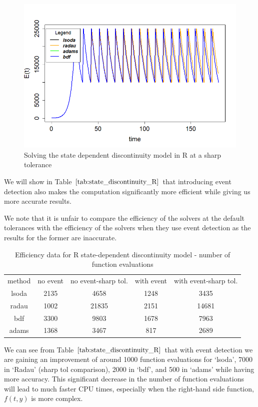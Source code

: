 \begin{figure}[H]
\centering
\includegraphics[width=0.7\linewidth]{./figures/solve_state_discontinuity_sharp_R}
\caption{Solving the state dependent discontinuity model in R at a sharp tolerance}
\label{fig:solve_state_discontinuity_sharp_R}
\end{figure}

We will show in Table $\ref{tab:state_discontinuity_R}$ that introducing event detection also makes the computation significantly more efficient while giving us more accurate results.

We note that it is unfair to compare the efficiency of the solvers at the default tolerances with the efficiency of the solvers when they use event detection as the results for the former are inaccurate.

\begin{table}[h]
\caption {Efficiency data for R state-dependent discontinuity model - number of function evaluations} 
\label{tab:state_discontinuity_R}
\begin{center}
\begin{tabular}{ c c c c c } 
method & no event & no event-sharp tol. & with event & with event-sharp tol.\\ 
lsoda & 2135 & 4658 & 1248 & 3435 \\
radau & 1002 & 21835 & 2151 & 14681\\
bdf & 3300 & 9803 & 1678 & 7963\\
adams & 1368 & 3467 & 817 & 2689\\
\end{tabular}
\end{center}
\end{table}

We can see from Table $\ref{tab:state_discontinuity_R}$ that with event detection we are gaining an improvement of around 1000 function evaluations for `lsoda', 7000 in `Radau' (sharp tol comparison), 2000 in `bdf', and 500 in `adams' while having more accuracy. This significant decrease in the number of function evaluations will lead to much faster CPU times, especially when the right-hand side function, $f(t, y)$ is more complex.

